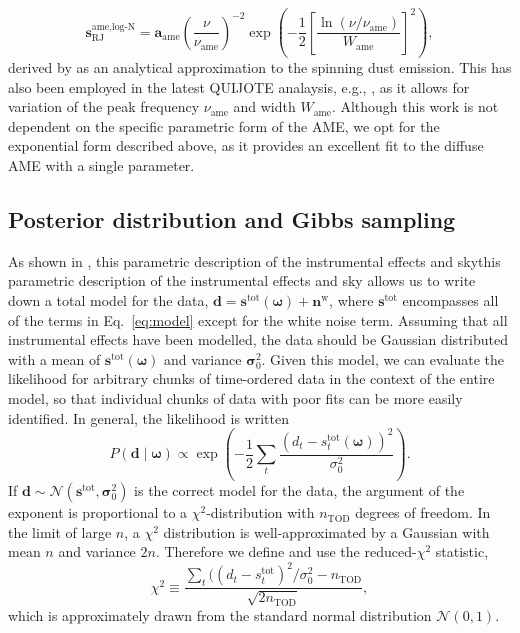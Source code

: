 \documentclass[twocolumn]{../../common/aa}
\begin{document}
\begin{equation}
	\boldsymbol s_\mathrm{RJ}^\textrm{ame,log-N}=\boldsymbol a_\mathrm{ame}
	\left(\frac{\nu}{\nu_\mathrm{ame}}\right)^{-2}\exp\left(-\frac12\left[\frac{\ln(\nu/\nu_\mathrm{ame})}{W_\mathrm{ame}}\right]^2\right),
\end{equation}
derived by \citet{Stevenson_2014} as an analytical approximation to the spinning dust emission. This has also been employed in the latest QUIJOTE analaysis, e.g., \citet{QUIJOTE_V}, as it allows for variation of the peak frequency $\nu_\mathrm{ame}$ and width $W_\mathrm{ame}$. Although this work is not dependent on the specific parametric form of the AME, we opt for the exponential form described above, as it provides an excellent fit to the diffuse AME with a single parameter.


\subsection{Posterior distribution and Gibbs sampling}

As shown in \citet{bp01}, this parametric description of the instrumental effects and skythis parametric description of the instrumental effects and sky  allows us to write down a total model for the data, $\boldsymbol d=\boldsymbol s^\mathrm{tot}(\boldsymbol\omega)+\boldsymbol n^\mathrm w$, where $\boldsymbol s^\mathrm{tot}$ encompasses all of the terms in Eq.~\eqref{eq:model} except for the white noise term. Assuming that all instrumental effects have been modelled, the data should be Gaussian distributed with a mean of $\boldsymbol s^\mathrm{tot}(\boldsymbol\omega)$ and variance $\boldsymbol \sigma_0^2$. Given this model, we can evaluate the likelihood for arbitrary chunks of time-ordered data in the context of the entire model, so that individual chunks of data with poor fits can be more easily identified. In general, the likelihood is written
\begin{equation}
	P(\boldsymbol d\mid\boldsymbol\omega)\propto\exp\left(-\frac12\sum_t\frac{(d_t-s^\mathrm{tot}_t(\boldsymbol\omega))^2}{\sigma_0^2}
	\right).
\end{equation}
If $\boldsymbol d\sim\mathcal N(\boldsymbol s^\mathrm{tot},\boldsymbol\sigma_0^2)$ is the correct model for the data, the argument of the exponent is proportional to a $\chi^2$-distribution with $n_\mathrm{TOD}$ degrees of freedom. In the limit of large $n$, a $\chi^2$ distribution is well-approximated by a Gaussian with mean $n$ and variance $2n$. Therefore we define and use the reduced-$\chi^2$ statistic,
\begin{equation}
	\chi^2\equiv \frac{\sum_t((d_t-s_t^\mathrm{tot})^2/\sigma_0^2 - n_\mathrm{TOD}}{\sqrt{2n_\mathrm{TOD}}},
\end{equation}
which is approximately drawn from the standard normal distribution $\mathcal N(0,1)$.
\end{document}
